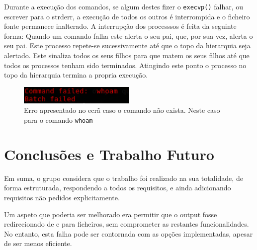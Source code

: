 \documentclass[12pt,a4paper]{report}
\begin{document}
    Durante a execução dos comandos, se algum destes fizer o
    \texttt{execvp()} falhar, ou escrever para o strderr, a execução de
    todos os outros é interrompida e o ficheiro fonte permanece inalterado.
    A interrupção dos processsos é feita da seguinte forma: Quando um comando
    falha este alerta o seu pai, que, por sua vez, alerta o seu pai. Este
    processo repete-se sucessivamente até que o topo da hierarquia seja
    alertado. Este sinaliza todos os seus filhos para que matem os seus
    filhos até que todos os processos tenham sido terminados. Atingindo
    este ponto o processo no topo da hierarquia termina a propria execução.

    \begin{figure}[h]
        \centering
        \includegraphics[width=0.5\textwidth]{./images/execError.png}
        \caption{Erro apresentado no ecrã caso o comando não exista. Neste caso
                    para o comando \texttt{whoam}}
    \end{figure}

\chapter{Conclusões e Trabalho Futuro}
    Em suma, o grupo considera que o trabalho foi realizado na sua
    totalidade, de forma estruturada, respondendo a todos os requisitos, e ainda
    adicionando requisitos não pedidos explicitamente.

    Um aspeto que poderia ser melhorado era permitir que o output fosse
    redirecionado de e para ficheiros, sem comprometer as restantes
    funcionalidades. No entanto, esta falha pode ser contornada com as opções
    implementadas, apesar de ser menos eficiente.
\end{document}
